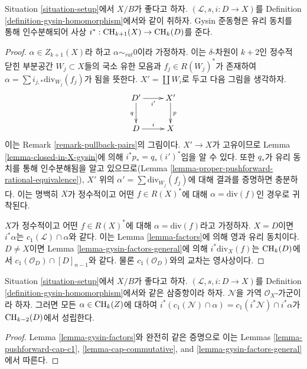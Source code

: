 \begin{lemma}
\label{lemma-gysin-factors}
Situation \ref{situation-setup}에서 $X/B$가 좋다고 하자.
$(\mathcal{L}, s, i : D \to X)$를 Definition
\ref{definition-gysin-homomorphism}에서와 같이 취하자.
Gysin 준동형은 유리 동치를 통해 인수분해되어
사상 $i^* : \mathop{\mathrm{CH}}\nolimits_{k + 1}(X) \to \mathop{\mathrm{CH}}\nolimits_k(D)$를 준다.
\end{lemma}

\begin{proof}
$\alpha \in Z_{k + 1}(X)$라 하고 $\alpha \sim_{rat} 0$이라 가정하자.
이는 $\delta$-차원이 $k + 2$인 정수적 닫힌 부분공간
$W_j \subset X$들의 국소 유한 모음과 $f_j \in R(W_j)^*$가 존재하여
$\alpha = \sum i_{j, *}\text{div}_{W_j}(f_j)$가 됨을 뜻한다.
$X' = \coprod W_i$로 두고 다음 그림을 생각하자.
$$
\xymatrix{
D' \ar[d]_q \ar[r]_{i'} & X' \ar[d]^p \\
D \ar[r]^i & X
}
$$
이는 Remark \ref{remark-pullback-pairs}의 그림이다.
$X' \to X$가 고유이므로 Lemma \ref{lemma-closed-in-X-gysin}에 의해
$i^*p_* = q_*(i')^*$임을 알 수 있다. 또한 $q_*$가 유리 동치를 통해
인수분해됨을 알고 있으므로(Lemma
\ref{lemma-proper-pushforward-rational-equivalence}),
$X'$ 위의 $\alpha' = \sum \text{div}_{W_j}(f_j)$에 대해 결과를
증명하면 충분하다. 이는 명백히 $X$가 정수적이고 어떤
$f \in R(X)^*$에 대해 $\alpha = \text{div}(f)$인 경우로 귀착된다.

\medskip\noindent
$X$가 정수적이고 어떤 $f \in R(X)^*$에 대해
$\alpha = \text{div}(f)$라고 가정하자. $X = D$이면
$i^*\alpha$는 $c_1(\mathcal{L}) \cap \alpha$와 같다.
이는 Lemma \ref{lemma-factors}에 의해 영과 유리 동치이다.
$D \not = X$이면 Lemma \ref{lemma-gysin-factors-general}에 의해
$i^*\text{div}_X(f)$는 $\mathop{\mathrm{CH}}\nolimits_k(D)$에서
$c_1(\mathcal{O}_D) \cap [D]_{n - 1}$와 같다.
물론 $c_1(\mathcal{O}_D)$와의 교차는 영사상이다.
\end{proof}

\begin{lemma}
\label{lemma-gysin-commutes-cap-c1}
Situation \ref{situation-setup}에서 $X/B$가 좋다고 하자.
$(\mathcal{L}, s, i : D \to X)$를 Definition
\ref{definition-gysin-homomorphism}에서와 같은 삼중항이라 하자.
$\mathcal{N}$을 가역 $\mathcal{O}_X$-가군이라 하자. 그러면 모든
$\alpha \in \mathop{\mathrm{CH}}\nolimits_k(Z)$에 대하여
$i^*(c_1(\mathcal{N}) \cap \alpha) = c_1(i^*\mathcal{N}) \cap i^*\alpha$가
$\mathop{\mathrm{CH}}\nolimits_{k - 2}(D)$에서 성립한다.
\end{lemma}

\begin{proof}
Lemma \ref{lemma-gysin-factors}와 완전히 같은 증명으로 이는 Lemmas
\ref{lemma-pushforward-cap-c1},
\ref{lemma-cap-commutative}, and
\ref{lemma-gysin-factors-general}에서 따른다.
\end{proof}

